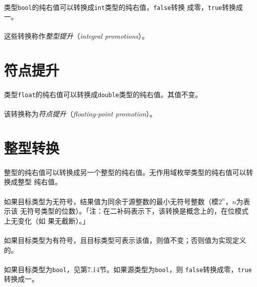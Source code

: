 \paragraph{}
类型\texttt{bool}的纯右值可以转换成\texttt{int}类型的纯右值，\texttt{false}转换
成零，\texttt{true}转换成一。

\paragraph{}
这些转换称作\textit{整型提升}（\textit{integral promotions}）。

\section{符点提升}
\paragraph{}
类型\texttt{float}的纯右值可以转换成\texttt{double}类型的纯右值。其值不变。

\paragraph{}
该转换称为\textit{符点提升}（\textit{floating-point promotion}）。

\section{整型转换}
\paragraph{}
整型的纯右值可以转换成另一个整型的纯右值。无作用域枚举类型的纯右值可以转换成整型
纯右值。

\paragraph{}
如果目标类型为无符号，结果值为同余于源整数的最小无符号整数（模$2^n$，$n$为表示该
无符号类型的位数）。「注：在二补码表示下，该转换是概念上的，在位模式上无变化（如
果无截断）。」

\paragraph{}
如果目标类型为有符号，且目标类型可表示该值，则值不变；否则值为实现定义的。

\paragraph{}
如果目标类型为\texttt{bool}，见第7.14节。如果源类型为\texttt{bool}，则
\texttt{false}转换成零，\texttt{true}转换成一。

